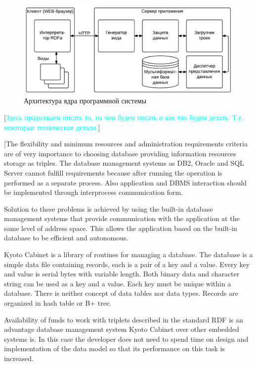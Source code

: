 \documentclass[utf8]{../IncArticle}
\newcommand{\e}[2][fcolor]{\textcolor{pcolor}{[}\textcolor{#1}{#2}\textcolor{pcolor}{]}}
\begin{document}
\begin{figure}[!t]
\centering
\includegraphics[width=0.8\linewidth]{peixe-architecture-ru-1.pdf}
\caption{Архитектура ядра программной системы}
\label{architecture}
\end{figure}


\e[cyan]{Здесь продолжаем писать то, на чем будем писать и как что
  будем делать. Т.е. некоторые технические детали.}


[The flexibility and minimum resources and administration requirements criteria are of very importance to choosing database providing information resources storage as triples.  The database management systems as DB2, Oracle and SQL Server cannot fulfill requirements because after running the operation is performed as a separate process.  Also application and DBMS interaction should be implemented through interprocess communication form.

Solution to these problems is achieved by using the built-in database management systems that provide communication with the application at the same level of address space.  This allows the application based on the built-in database to be efficient and autonomous.

Kyoto Cabinet is a library of routines for managing a database.  The database is a simple data file containing records, each is a pair of a key and a value.  Every key and value is serial bytes with variable length.  Both binary data and character string can be used as a key and a value.  Each key must be unique within a database.  There is neither concept of data tables nor data types.  Records are organized in hash table or B+ tree.  \cite{b1}

Availability of funds to work with triplets described in the standard RDF is an advantage database management system Kyoto Cabinet over other embedded systems is.  In this case the developer does not need to spend time on design and implementation of the data model so that its performance on this task is increased.
\end{document}
